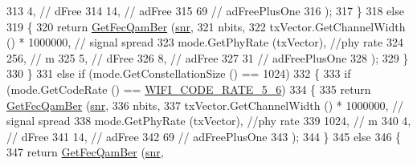 \begin{DoxyCode}
313                                    4,  \textcolor{comment}{// dFree}
314                                    14,  \textcolor{comment}{// adFree}
315                                    69  \textcolor{comment}{// adFreePlusOne}
316                                    );
317             \}
318           \textcolor{keywordflow}{else}
319             \{
320               \textcolor{keywordflow}{return} \hyperlink{classns3_1_1YansErrorRateModel_a456a5ba3fc8c6a9fe67ed25971364ff0}{GetFecQamBer} (\hyperlink{lte__amc_8m_a7543c5e4e80c828b652e0c63e4a6de70}{snr},
321                                    nbits,
322                                    txVector.GetChannelWidth () * 1000000, \textcolor{comment}{// signal spread}
323                                    mode.GetPhyRate (txVector), \textcolor{comment}{//phy rate}
324                                    256, \textcolor{comment}{// m}
325                                    5,  \textcolor{comment}{// dFree}
326                                    8,  \textcolor{comment}{// adFree}
327                                    31  \textcolor{comment}{// adFreePlusOne}
328                                    );
329             \}
330         \}
331       \textcolor{keywordflow}{else} \textcolor{keywordflow}{if} (mode.GetConstellationSize () == 1024)
332         \{
333           \textcolor{keywordflow}{if} (mode.GetCodeRate () == \hyperlink{namespacens3_aeaf3a86fd4bdb7829955238fba43e2adaf0309d61b4cf97e5718f6d3b9fdba3aa}{WIFI\_CODE\_RATE\_5\_6})
334             \{
335               \textcolor{keywordflow}{return} \hyperlink{classns3_1_1YansErrorRateModel_a456a5ba3fc8c6a9fe67ed25971364ff0}{GetFecQamBer} (\hyperlink{lte__amc_8m_a7543c5e4e80c828b652e0c63e4a6de70}{snr},
336                                    nbits,
337                                    txVector.GetChannelWidth () * 1000000, \textcolor{comment}{// signal spread}
338                                    mode.GetPhyRate (txVector), \textcolor{comment}{//phy rate}
339                                    1024, \textcolor{comment}{// m}
340                                    4,  \textcolor{comment}{// dFree}
341                                    14,  \textcolor{comment}{// adFree}
342                                    69  \textcolor{comment}{// adFreePlusOne}
343                                    );
344             \}
345           \textcolor{keywordflow}{else}
346             \{
347               \textcolor{keywordflow}{return} \hyperlink{classns3_1_1YansErrorRateModel_a456a5ba3fc8c6a9fe67ed25971364ff0}{GetFecQamBer} (\hyperlink{lte__amc_8m_a7543c5e4e80c828b652e0c63e4a6de70}{snr},

\end{DoxyCode}
